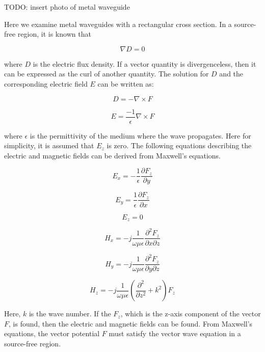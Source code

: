 \documentclass[a4paper,11pt]{jsarticle}
\begin{document}
TODO: insert photo of metal waveguide

Here we examine metal waveguides with a rectangular cross section.
In a source-free region, it is known that

\begin{equation}
  \nabla D = 0
\end{equation}

where $D$ is the electric flux density.
If a vector quantity is divergenceless,
then it can be expressed as the curl of another quantity.
The solution for $D$ and the corresponding electric field $E$
can be written as:

\begin{equation}
  D = -\nabla \times F
\end{equation}

\begin{equation}
  E = \frac{-1}{\epsilon}\nabla \times F
\end{equation}

where $\epsilon$ is the permittivity of the medium where the wave propagates.
Here for simplicity, it is assumed that $E_z$ is zero.
The following equations describing the electric and magnetic fields can be derived from Maxwell's equations.

\begin{equation}
  E_x = -\frac{1}{\epsilon}\frac{\partial F_z}{\partial y}
\end{equation}

\begin{equation}
  E_y = \frac{1}{\epsilon}\frac{\partial F_z}{\partial x}
\end{equation}

\begin{equation}
  E_z = 0
\end{equation}

\begin{equation}
  H_x = -j\frac{1}{\omega\mu\epsilon}\frac{\partial^2F_z}{\partial x \partial z}
\end{equation}

\begin{equation}
  H_y = -j\frac{1}{\omega\mu\epsilon}\frac{\partial^2F_z}{\partial y \partial z}
\end{equation}

\begin{equation}
  H_z = -j\frac{1}{\omega\mu\epsilon}(\frac{\partial^2}{\partial z^2} + k^2)F_z
\end{equation}

Here, $k$ is the wave number.
If the $F_z$, which is the z-axis component of the vector $F$, is found,
then the electric and magnetic fields can be found.
From Maxwell's equations, the vector potential $F$ must satisfy the vector wave equation
in a source-free region.
\end{document}
